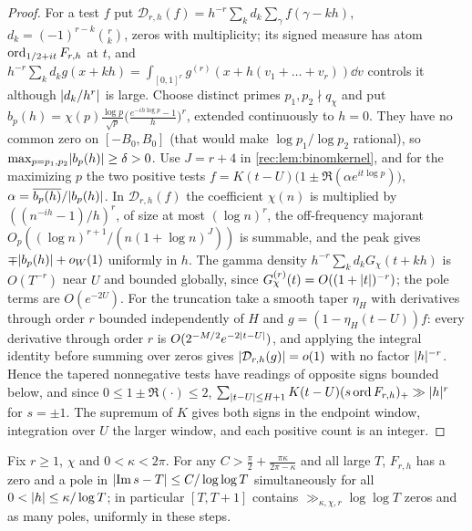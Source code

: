 \begin{proof}
For a test $f$ put $\mathcal D_{r,h}(f)=h^{-r}\sum_kd_k\sum_\gamma f(\gamma-kh)$, $d_k=(-1)^{r-k}\binom rk$, zeros with
multiplicity; its signed measure has atom $\operatorname{ord}_{1/2+it}F_{r,h}$ at $t$, and
$h^{-r}\sum_kd_kg(x+kh)=\int_{[0,1]^r}g^{(r)}(x+h(v_1+\dots+v_r))\dd v$ controls it although $\lvert d_k/h^r\rvert$ is large.
Choose distinct primes $p_1,p_2\nmid q_\chi$ and put $b_p(h)=\chi(p)\frac{\log p}{\sqrt p}\bigl(\frac{e^{-ih\log p}-1}h\bigr)^r$,
extended continuously to $h=0$. They have no common zero on $[-B_0,B_0]$ (that would make
$\log p_1/\log p_2$ rational), so $\max_{p=p_1,p_2}\lvert b_p(h)\rvert\ge\delta>0$. Use $J=r+4$ in
\cref{rec:lem:binomkernel}, and for the maximizing $p$ the two positive tests
$f=K(t-U)\bigl(1\pm\Re(\alpha e^{it\log p})\bigr)$, $\alpha=\overline{b_p(h)}/\lvert b_p(h)\rvert$. In
$\mathcal D_{r,h}(f)$ the coefficient $\chi(n)$ is multiplied by $((n^{-ih}-1)/h)^r$, of size at most
$(\log n)^r$, the off-frequency majorant $O_p((\log n)^{r+1}/(n(1+\log n)^J))$ is summable, and the
peak gives $\mp\lvert b_p(h)\rvert+o_W(1)$ uniformly in $h$. The gamma density
$h^{-r}\sum_kd_kG_\chi(t+kh)$ is $O(T^{-r})$ near $U$ and bounded globally, since
$G_\chi^{(r)}(t)=O((1+\lvert t\rvert)^{-r})$; the pole terms are $O(e^{-2U})$. For the truncation take a smooth
taper $\eta_H$ with derivatives through order $r$ bounded independently of $H$ and
$g=(1-\eta_H(t-U))f$: every derivative through order $r$ is $O(2^{-M/2}e^{-2\lvert t-U\rvert})$, and applying the
integral identity before summing over zeros gives $\lvert\mathcal D_{r,h}(g)\rvert=o(1)$ with no factor
$\lvert h\rvert^{-r}$. Hence the tapered nonnegative tests have readings of opposite signs bounded below,
and since $0\le1\pm\Re(\cdot)\le2$, $\sum_{\lvert t-U\rvert\le H+1}K(t-U)(s\operatorname{ord} F_{r,h})_+\gg\lvert h\rvert^r$ for $s=\pm1$. The
supremum of $K$ gives both signs in the endpoint window, integration over $U$ the larger window,
and each positive count is an integer.
\end{proof}

\begin{theorem}\label{rec:thm:micro}
Fix $r\ge1$, $\chi$ and $0<\kappa<2\pi$. For any $C>\frac\pi2+\frac{\pi\kappa}{2\pi-\kappa}$ and all large $T$, $F_{r,h}$ has
a zero and a pole in $\lvert\operatorname{Im} s-T\rvert\le C/\log\log T$ simultaneously for all $0<\lvert h\rvert\le\kappa/\log T$;
in particular $[T,T+1]$ contains $\gg_{\kappa,\chi,r}\log\log T$ zeros and as many poles, uniformly in these
steps.
\end{theorem}

